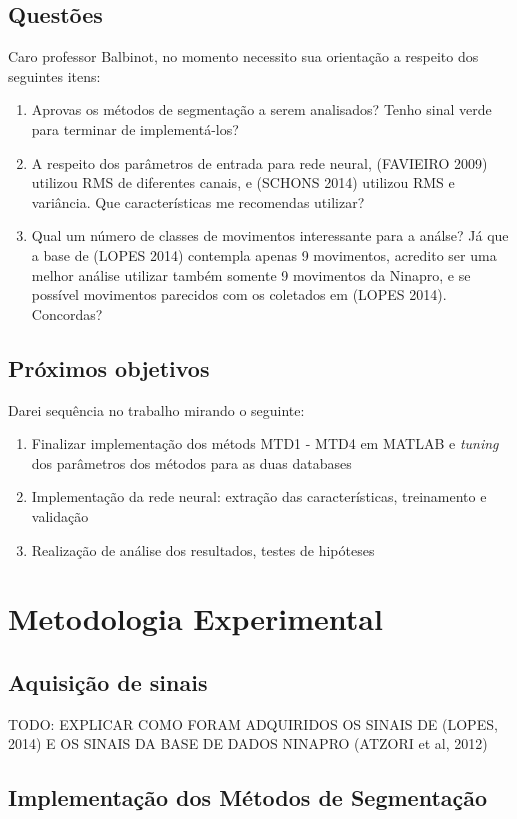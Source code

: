 \documentclass[
	12pt,				%
	openright,			%
	oneside,
	a4paper,			%
	english,			%
	francais,			%
	spanish,			%
	brazil				%
	]{abntex2}
\begin{document}
\section{Questões}
Caro professor Balbinot, no momento necessito sua orientação a respeito dos seguintes itens:
\begin{enumerate}
	\item Aprovas os métodos de segmentação a serem analisados? Tenho sinal verde para terminar de implementá-los?
	\item A respeito dos parâmetros de entrada para rede neural, (FAVIEIRO 2009) utilizou RMS de diferentes canais, e (SCHONS 2014) utilizou RMS e variância. Que características me recomendas utilizar?
	\item Qual um número de classes de movimentos interessante para a análse? Já que a base de (LOPES 2014) contempla apenas 9 movimentos, acredito ser uma melhor análise utilizar também somente 9 movimentos da Ninapro, e se possível movimentos parecidos com os coletados em (LOPES 2014). Concordas?
\end{enumerate}

\section{Próximos objetivos}
Darei sequência no trabalho mirando o seguinte:
\begin{enumerate}
	\item Finalizar implementação dos métods MTD1 - MTD4 em MATLAB e \emph{tuning} dos parâmetros dos métodos para as duas databases
	\item Implementação da rede neural: extração das características, treinamento e validação
	\item Realização de análise dos resultados, testes de hipóteses
\end{enumerate}
\chapter{Metodologia Experimental}
\section{Aquisição de sinais}

	TODO: EXPLICAR COMO FORAM ADQUIRIDOS OS SINAIS DE (LOPES, 2014) E OS SINAIS DA BASE DE DADOS NINAPRO (ATZORI et al, 2012)

\section{Implementação dos Métodos de Segmentação}
\end{document}
